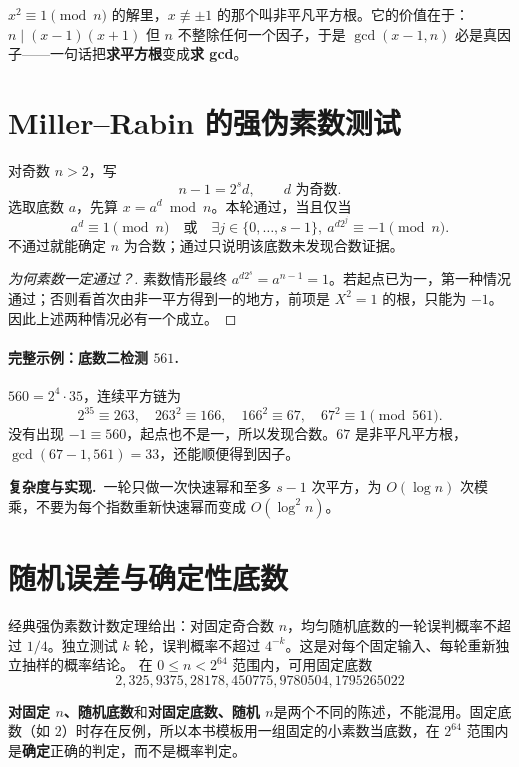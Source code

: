 \documentclass[UTF8,a4paper,11pt,twoside,openright,fontset=fandol]{ctexbook}
\theoremstyle{definition}
\newcommand{\cost}{\par\noindent\textbf{复杂度与实现.}\ }
\begin{document}
\begin{tip}[词义：非平凡平方根]
$x^2\equiv1\pmod n$ 的解里，$x\not\equiv\pm1$ 的那个叫非平凡平方根。它的价值在于：$n\mid(x-1)(x+1)$ 但 $n$ 不整除任何一个因子，于是 $\gcd(x-1,n)$ 必是真因子——一句话把\textbf{求平方根}变成\textbf{求 gcd}。
\end{tip}



\section{Miller--Rabin 的强伪素数测试}
对奇数 $n>2$，写
\[
 n-1=2^s d,\qquad d\text{ 为奇数}.
\]
选取底数 $a$，先算 $x=a^d\bmod n$。本轮通过，当且仅当
\[
 a^d\equiv1\pmod n
 \quad\text{或}\quad
 \exists j\in\{0,\ldots,s-1\},\ a^{d2^j}\equiv-1\pmod n.
\]
不通过就能确定 $n$ 为合数；通过只说明该底数未发现合数证据。


\begin{proof}[为何素数一定通过？]
素数情形最终 $a^{d2^s}=a^{n-1}=1$。若起点已为一，第一种情况通过；否则看首次由非一平方得到一的地方，前项是 $X^2=1$ 的根，只能为 $-1$。因此上述两种情况必有一个成立。
\end{proof}
\paragraph{完整示例：底数二检测 $561$.}
$560=2^4\cdot35$，连续平方链为
\[
 2^{35}\equiv263,\quad263^2\equiv166,\quad166^2\equiv67,\quad67^2\equiv1\pmod{561}.
\]
没有出现 $-1\equiv560$，起点也不是一，所以发现合数。$67$ 是非平凡平方根，$\gcd(67-1,561)=33$，还能顺便得到因子。
\cost 一轮只做一次快速幂和至多 $s-1$ 次平方，为 $O(\log n)$ 次模乘，不要为每个指数重新快速幂而变成 $O(\log^2n)$。


\section{随机误差与确定性底数}
经典强伪素数计数定理给出：对固定奇合数 $n$，均匀随机底数的一轮误判概率不超过 $1/4$。独立测试 $k$ 轮，误判概率不超过 $4^{-k}$。这是对每个固定输入、每轮重新独立抽样的概率结论。
在 $0\le n<2^{64}$ 范围内，可用固定底数
\[
 2,325,9375,28178,450775,9780504,1795265022
\]

\begin{tip}[口径：随机的是底数还是模数]
\textbf{对固定 $n$、随机底数}和\textbf{对固定底数、随机 $n$}是两个不同的陈述，不能混用。固定底数（如 $2$）时存在反例，所以本书模板用一组固定的小素数当底数，在 $2^{64}$ 范围内是\textbf{确定}正确的判定，而不是概率判定。
\end{tip}
\end{document}
